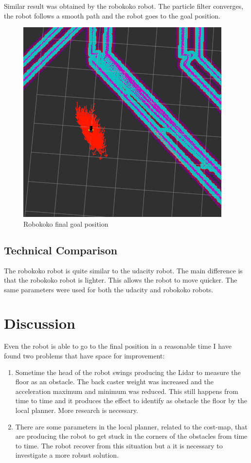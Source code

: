 \documentclass[10pt,journal,compsoc]{IEEEtran}
\begin{document}
Similar result was obtained by the robokoko robot. The particle filter converges, the robot follows a smooth path and the robot goes to the goal position.

\begin{figure}[h]
\centering
\includegraphics[scale=0.3]{rviz-robot-own-goal-position}
\caption{Robokoko final goal position}
\label{fig:mesh4}
\end{figure}

\subsection{Technical Comparison} %

The robokoko robot is quite similar to the udacity robot. The main difference is that the robokoko robot is lighter. This allows the robot to move quicker. The same parameters were used for both the udacity and robokoko robots. 

\section{Discussion}

Even the robot is able to go to the final position in a reasonable time I have found two problems that have space for improvement:

\begin{enumerate}
\item Sometime the head of the robot swings producing the Lidar to measure the floor as an obstacle. The back caster weight was increased and the acceleration maximum and minimum was reduced. This still happens from time to time and it produces the effect to identify as obstacle the floor by the local planner. More research is necessary.
\item There are some parameters in the local planner, related to the cost-map, that are producing the robot to get stuck in the corners of the obstacles from time to time. The robot recover from this situation but a it is necessary to investigate a more robust solution.
\end{enumerate}	
\end{document}

